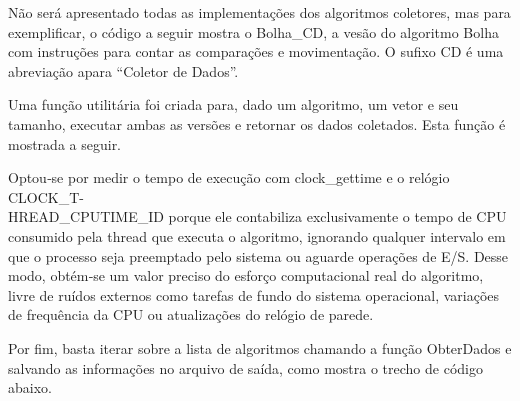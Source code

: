 Não será apresentado todas as implementações dos algoritmos coletores, mas para exemplificar, o código a seguir mostra o Bolha\_CD, a vesão do algoritmo Bolha com instruções para contar as comparações e movimentação. O sufixo CD é uma abreviação apara ``Coletor de Dados''.


Uma função utilitária foi criada para, dado um algoritmo, um vetor e seu tamanho, executar ambas as versões e retornar os dados coletados. Esta função é mostrada a seguir.


Optou‑se por medir o tempo de execução com clock\_gettime e o relógio CLOCK\_T-\\HREAD\_CPUTIME\_ID porque ele contabiliza exclusivamente o tempo de CPU consumido pela thread que executa o algoritmo, ignorando qualquer intervalo em que o processo seja preemptado pelo sistema ou aguarde operações de E/S. Desse modo, obtém‑se um valor preciso do esforço computacional real do algoritmo, livre de ruídos externos como tarefas de fundo do sistema operacional, variações de frequência da CPU ou atualizações do relógio de parede.

Por fim, basta iterar sobre a lista de algoritmos chamando a função ObterDados e salvando as informações no arquivo de saída, como mostra o trecho de código abaixo.


